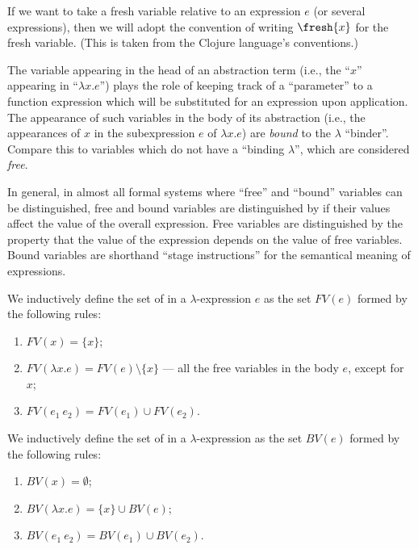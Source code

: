 \begin{node}[Syntax]
\begin{definition}
If we want to take a fresh variable relative to an expression $e$ (or
several expressions), then we will adopt the convention of writing
$\fresh{x}$ for the fresh variable. (This is taken from the Clojure
language's conventions.)
\end{definition}

\begin{node}\label{untyped-lambda-0007}%
The variable appearing in the head of an abstraction term (i.e., the
``$x$'' appearing in ``$\lambda x.e$'') plays the role of keeping track
of a ``parameter'' to a function expression which will be substituted
for an expression upon application. The appearance of such variables in
the body of its abstraction (i.e., the appearances of $x$ in the
subexpression $e$ of $\lambda x.e$) are \emph{bound} to the $\lambda$
``binder''. Compare this to variables which do not have a ``binding
$\lambda$'', which are considered \emph{free}.

In general, in almost all formal systems where ``free'' and ``bound''
variables can be distinguished, free and bound variables are
distinguished by if their values affect the value of the overall
expression. Free variables are distinguished by the property that the
value of the expression depends on the value of free variables. Bound
variables are shorthand ``stage instructions'' for the semantical
meaning of expressions.

\begin{definition}\label{untyped-lambda-0005}%
We inductively define the set of  in a
$\lambda$-expression $e$ as the set $FV(e)$ formed by the following rules:
\begin{enumerate}
\item $FV(x)=\{x\}$;
\item $FV(\lambda x.e)=FV(e)\setminus\{x\}$ --- all the free variables
  in the body $e$, except for $x$;
\item $FV(e_{1}~e_{2})=FV(e_{1})\cup FV(e_{2})$.
\end{enumerate}
\end{definition}

\begin{definition}\label{untyped-lambda-0006}%
We inductively define the set of  in a
$\lambda$-expression as the set $BV(e)$ formed by the following rules:
\begin{enumerate}
\item $BV(x)=\emptyset$;
\item $BV(\lambda x.e)=\{x\}\cup BV(e)$;
\item $BV(e_{1}~e_{2})=BV(e_{1})\cup BV(e_{2})$.
\end{enumerate}
\end{definition}


\end{node}
\end{node}
